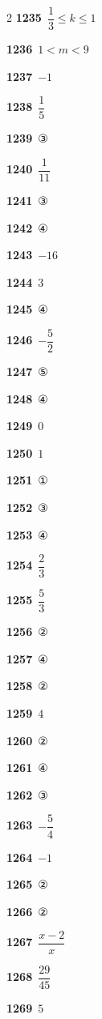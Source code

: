 \documentclass[10pt,a4paper]{article}
\begin{document}
\begin{multicols}{2}
\noindent\textbf{1235}\ $\dfrac{1}{3}\le k\le 1$\par
\noindent\textbf{1236}\ $1<m<9$\par
\noindent\textbf{1237}\ $-1$\par
\noindent\textbf{1238}\ $\dfrac{1}{5}$\par
\noindent\textbf{1239}\ ③\par
\noindent\textbf{1240}\ $\dfrac{1}{11}$\par
\noindent\textbf{1241}\ ③\par
\noindent\textbf{1242}\ ④\par
\noindent\textbf{1243}\ $-16$\par
\noindent\textbf{1244}\ $3$\par
\noindent\textbf{1245}\ ④\par
\noindent\textbf{1246}\ $-\dfrac{5}{2}$\par
\noindent\textbf{1247}\ ⑤\par
\noindent\textbf{1248}\ ④\par
\noindent\textbf{1249}\ $0$\par
\noindent\textbf{1250}\ $1$\par
\noindent\textbf{1251}\ ①\par
\noindent\textbf{1252}\ ③\par
\noindent\textbf{1253}\ ④\par
\noindent\textbf{1254}\ $\dfrac{2}{3}$\par
\noindent\textbf{1255}\ $\dfrac{5}{3}$\par
\noindent\textbf{1256}\ ②\par
\noindent\textbf{1257}\ ④\par
\noindent\textbf{1258}\ ②\par
\noindent\textbf{1259}\ $4$\par
\noindent\textbf{1260}\ ②\par
\noindent\textbf{1261}\ ④\par
\noindent\textbf{1262}\ ③\par
\noindent\textbf{1263}\ $-\dfrac{5}{4}$\par
\noindent\textbf{1264}\ $-1$\par
\noindent\textbf{1265}\ ②\par
\noindent\textbf{1266}\ ②\par
\noindent\textbf{1267}\ $\dfrac{x-2}{x}$\par
\noindent\textbf{1268}\ $\dfrac{29}{45}$\par
\noindent\textbf{1269}\ $5$\par

\end{multicols}
\end{document}
